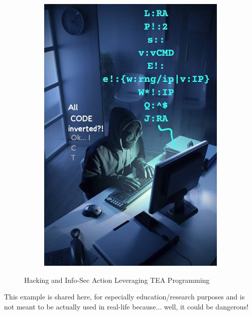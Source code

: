 \documentclass[a4paper, 18pt]{book} %
\begin{document}
\begin{figure}[H]
\begin{subfigure}[b]{0.45\textwidth}
    \includegraphics[width=\textwidth]{resources/images/hacker.jpg}
  \end{subfigure}
  \caption{Hacking and Info-Sec Action Leveraging TEA Programming}
  \label{FIGSELFMODDEMO2}
\end{figure}



This example is shared here, for especially education/research purposes and is not meant to be actually used in real-life because... well, it could be dangerous!

\vspace{1em}
\end{document}
